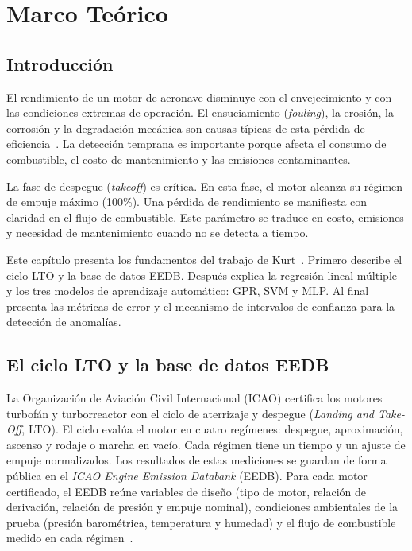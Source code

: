 \chapter{Marco Teórico}
\label{chap:marco_teorico}

\section{Introducción}

El rendimiento de un motor de aeronave disminuye con el envejecimiento y con las condiciones extremas de operación. El ensuciamiento (\textit{fouling}), la erosión, la corrosión y la degradación mecánica son causas típicas de esta pérdida de eficiencia~\cite{Kurt2024}. La detección temprana es importante porque afecta el consumo de combustible, el costo de mantenimiento y las emisiones contaminantes.

La fase de despegue (\textit{takeoff}) es crítica. En esta fase, el motor alcanza su régimen de empuje máximo (100\%). Una pérdida de rendimiento se manifiesta con claridad en el flujo de combustible. Este parámetro se traduce en costo, emisiones y necesidad de mantenimiento cuando no se detecta a tiempo.

Este capítulo presenta los fundamentos del trabajo de Kurt~\cite{Kurt2024}. Primero describe el ciclo LTO y la base de datos EEDB. Después explica la regresión lineal múltiple y los tres modelos de aprendizaje automático: GPR, SVM y MLP. Al final presenta las métricas de error y el mecanismo de intervalos de confianza para la detección de anomalías.

\section{El ciclo LTO y la base de datos EEDB}

La Organización de Aviación Civil Internacional (ICAO) certifica los motores turbofán y turborreactor con el ciclo de aterrizaje y despegue (\textit{Landing and Take-Off}, LTO). El ciclo evalúa el motor en cuatro regímenes: despegue, aproximación, ascenso y rodaje o marcha en vacío. Cada régimen tiene un tiempo y un ajuste de empuje normalizados. Los resultados de estas mediciones se guardan de forma pública en el \textit{ICAO Engine Emission Databank} (EEDB). Para cada motor certificado, el EEDB reúne variables de diseño (tipo de motor, relación de derivación, relación de presión y empuje nominal), condiciones ambientales de la prueba (presión barométrica, temperatura y humedad) y el flujo de combustible medido en cada régimen~\cite{Kurt2024}.

